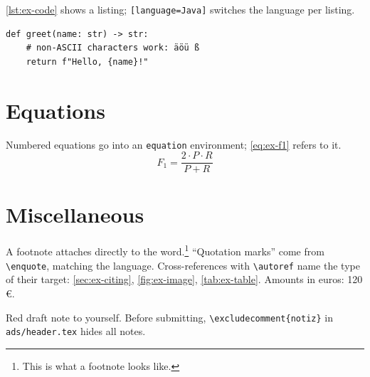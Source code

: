 \autoref{lst:ex-code} shows a listing; \texttt{[language=Java]} switches the language per listing.

\begin{lstlisting}[caption={Example listing in Python}, label={lst:ex-code}]
def greet(name: str) -> str:
    # non-ASCII characters work: äöü ß
    return f"Hello, {name}!"
\end{lstlisting}

\section{Equations}\label{sec:ex-equations}

Numbered equations go into an \texttt{equation} environment; \eqref{eq:ex-f1} refers to it.
\begin{equation}
  F_1 = \frac{2 \cdot P \cdot R}{P + R}
  \label{eq:ex-f1}
\end{equation}

\section{Miscellaneous}\label{sec:ex-misc}

A footnote attaches directly to the word.\footnote{This is what a footnote looks like.}
\enquote{Quotation marks} come from \texttt{\textbackslash enquote}, matching the language.
Cross-references with \texttt{\textbackslash autoref} name the type of their target: \autoref{sec:ex-citing}, \autoref{fig:ex-image}, \autoref{tab:ex-table}.
Amounts in euros: 120\,\euro{}.

\begin{notiz}
Red draft note to yourself.
Before submitting, \texttt{\textbackslash excludecomment\{notiz\}} in \texttt{ads/header.tex} hides all notes.
\end{notiz}
